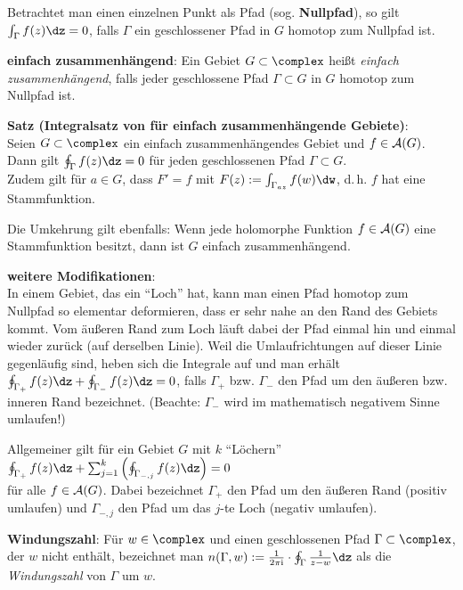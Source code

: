 Betrachtet man einen einzelnen Punkt als Pfad (sog. \textbf{Nullpfad}),
so gilt $\int_\Gamma f(z)\dz = 0$, falls $\Gamma$ ein geschlossener Pfad in $G$
homotop zum Nullpfad ist.

\linie

\textbf{einfach zusammenhängend}:
Ein Gebiet $G \subset \complex$ heißt \emph{einfach zusammenhängend}, falls
jeder geschlossene Pfad $\Gamma \subset G$ in $G$ homotop zum Nullpfad ist.

\textbf{Satz (Integralsatz von 
für einfach zusammenhängende Gebiete)}:\\
Seien $G \subset \complex$ ein einfach zusammenhängendes Gebiet und
$f \in \mathcal{A}(G)$.\\
Dann gilt $\oint_\Gamma f(z)\dz = 0$ für jeden
geschlossenen Pfad $\Gamma \subset G$.\\
Zudem gilt für $a \in G$, dass $F' = f$ mit
$F(z) := \int_{\Gamma_{az}} f(w)\dw$, d.\,h.
$f$ hat eine Stammfunktion.

Die Umkehrung gilt ebenfalls:
Wenn jede holomorphe Funktion $f \in \mathcal{A}(G)$ eine Stammfunktion besitzt,
dann ist $G$ einfach zusammenhängend.

\linie

\textbf{weitere Modifikationen}:\\
In einem Gebiet, das ein "`Loch"' hat, kann man einen
Pfad homotop zum Nullpfad so elementar deformieren, dass er sehr nahe an
den Rand des Gebiets kommt.
Vom äußeren Rand zum Loch läuft dabei der Pfad einmal
hin und einmal wieder zurück (auf derselben Linie).
Weil die Umlaufrichtungen auf dieser Linie gegenläufig sind, heben sich die
Integrale auf und man erhält
$\oint_{\Gamma_+} f(z)\dz + \oint_{\Gamma_-} f(z)\dz = 0$,
falls $\Gamma_+$ bzw. $\Gamma_-$ den Pfad um den äußeren bzw. inneren Rand
bezeichnet.
(Beachte: $\Gamma_-$ wird im mathematisch negativem Sinne umlaufen!)

Allgemeiner gilt für ein Gebiet $G$ mit $k$ "`Löchern"'
$\oint_{\Gamma_+} f(z)\dz +
\sum_{j=1}^k \left(\oint_{\Gamma_{-,j}} f(z)\dz\right) = 0$\\
für alle $f \in \mathcal{A}(G)$.
Dabei bezeichnet $\Gamma_+$ den Pfad um den äußeren Rand (positiv umlaufen)
und $\Gamma_{-,j}$ den Pfad um das $j$-te Loch (negativ umlaufen).

\linie

\textbf{Windungszahl}:
Für $w \in \complex$ und einen geschlossenen Pfad $\Gamma \subset \complex$,
der $w$ nicht enthält, bezeichnet man
$n(\Gamma, w) := \frac{1}{2\pi\i} \cdot \oint_\Gamma \frac{1}{z - w} \dz$ als
die \emph{Windungszahl} von $\Gamma$ um $w$.

